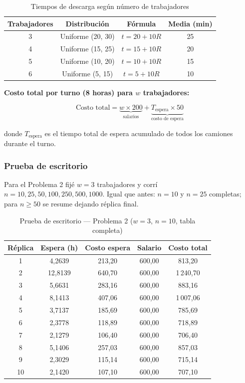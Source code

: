 \documentclass[12pt,a4paper]{article}
\begin{document}
\begin{table}[H]
\centering
\caption{Tiempos de descarga según número de trabajadores}
\begin{tabular}{cccc}
\toprule
\textbf{Trabajadores} & \textbf{Distribución} & \textbf{Fórmula} & \textbf{Media (min)} \\
\midrule
3 & Uniforme (20, 30) & $t = 20 + 10R$ & 25 \\
4 & Uniforme (15, 25) & $t = 15 + 10R$ & 20 \\
5 & Uniforme (10, 20) & $t = 10 + 10R$ & 15 \\
6 & Uniforme (5, 15)  & $t = 5 + 10R$  & 10 \\
\bottomrule
\end{tabular}
\end{table}

\textbf{Costo total por turno (8 horas) para $w$ trabajadores:}

\[
\text{Costo total} = \underbrace{w \times 200}_{\text{salarios}} + \underbrace{T_{\text{espera}} \times 50}_{\text{costo de espera}}
\]

donde $T_{\text{espera}}$ es el tiempo total de espera acumulado de todos los camiones durante el turno.

\subsubsection{Prueba de escritorio}

Para el Problema 2 fijé $w=3$ trabajadores y corrí $n=10,25,50,100,250,500,1000$. Igual que antes: $n=10$ y $n=25$ completas; para $n\ge 50$ se resume dejando réplica final.

\begin{table}[H]
\centering
\caption{Prueba de escritorio — Problema 2 ($w=3$, $n=10$, tabla completa)}
\begin{tabular}{ccccc}
\toprule
\textbf{Réplica} & \textbf{Espera (h)} & \textbf{Costo espera} & \textbf{Salario} & \textbf{Costo total} \\
\midrule
1 & 4,2639 & 213,20 & 600,00 & 813,20 \\
2 & 12,8139 & 640,70 & 600,00 & 1\,240,70 \\
3 & 5,6631 & 283,16 & 600,00 & 883,16 \\
4 & 8,1413 & 407,06 & 600,00 & 1\,007,06 \\
5 & 3,7137 & 185,69 & 600,00 & 785,69 \\
6 & 2,3778 & 118,89 & 600,00 & 718,89 \\
7 & 2,1279 & 106,40 & 600,00 & 706,40 \\
8 & 5,1406 & 257,03 & 600,00 & 857,03 \\
9 & 2,3029 & 115,14 & 600,00 & 715,14 \\
10 & 2,1420 & 107,10 & 600,00 & 707,10 \\
\bottomrule
\end{tabular}
\end{table}
\end{document}
